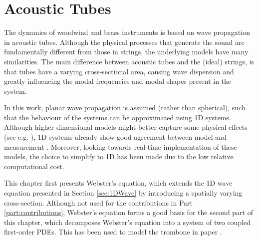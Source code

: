 \chapter{Acoustic Tubes}\label{ch:brass}

The dynamics of woodwind and brass instruments is based on wave propagation in acoustic tubes. Although the physical processes that generate the sound are fundamentally different from those in strings, the underlying models have many similarities. The main difference between acoustic tubes and the (ideal) strings, is that tubes have a varying cross-sectional area, causing wave dispersion and greatly influencing the modal frequencies and modal shapes present in the system.

In this work, planar wave propagation is assumed (rather than spherical), such that the behaviour of the systems can be approximated using 1D systems. Although higher-dimensional models might better capture some physical effects (see e.g. \cite{Kemp2002}), 1D systems already show good agreement between model and measurement \cite{Eveno2012}. Moreover, looking towards real-time implementation of these models, the choice to simplify to 1D has been made due to the low relative computational cost. 

This chapter first presents Webster's equation, which extends the 1D wave equation presented in Section \ref{sec:1DWave} by introducing a spatially varying cross-section. Although not used for the contributions in Part \ref{part:contributions}, Webster's equation forms a good basis for the second part of this chapter, which decomposes Webster's equation into a system of two coupled first-order PDEs. This has been used to model the trombone in paper \citeP[H].

